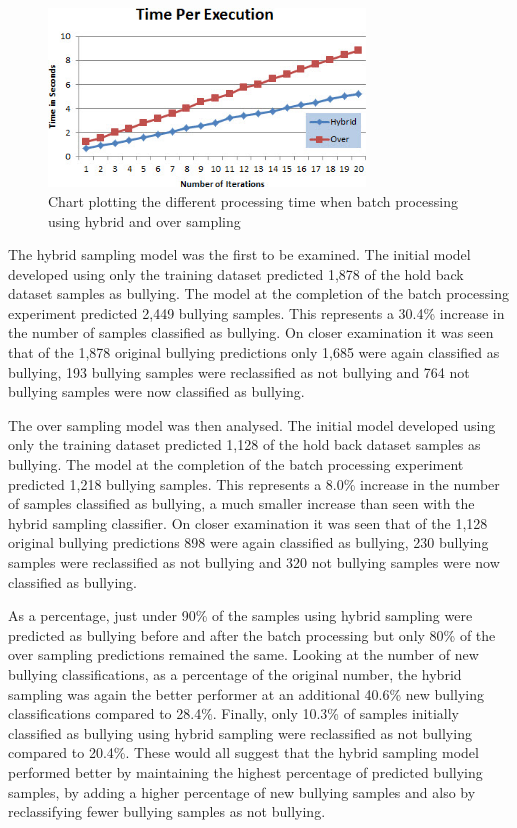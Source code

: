 \begin{figure}[htbp]
	\centering
	\includegraphics[width=0.75\textwidth]{Figures/Chapter5/execution_time.jpg}
	\caption[Processing time for batch simulation]{Chart plotting the different processing time when batch processing using hybrid and over sampling}
	\label{fig:execution_time}
\end{figure}

The hybrid sampling model was the first to be examined. The initial model developed using only the training dataset predicted 1,878 of the hold back dataset samples as bullying. The model at the completion of the batch processing experiment predicted 2,449 bullying samples. This represents a 30.4\% increase in the number of samples classified as bullying. On closer examination it was seen that of the 1,878 original bullying predictions only 1,685 were again classified as bullying, 193 bullying samples were reclassified as not bullying and 764 not bullying samples were now classified as bullying. 

The over sampling model was then analysed. The initial model developed using only the training dataset predicted 1,128 of the hold back dataset samples as bullying. The model at the completion of the batch processing experiment predicted 1,218 bullying samples. This represents a 8.0\% increase in the number of samples classified as bullying, a much smaller increase than seen with the hybrid sampling classifier. On closer examination it was seen that of the 1,128 original bullying predictions 898 were again classified as bullying, 230 bullying samples were reclassified as not bullying and 320 not bullying samples were now classified as bullying.

As a percentage, just under 90\% of the samples using hybrid sampling were predicted as bullying before and after the batch processing but only 80\% of the over sampling predictions remained the same. Looking at the number of new bullying classifications, as a percentage of the original number, the hybrid sampling was again the better performer at an additional 40.6\% new bullying classifications compared to 28.4\%. Finally, only 10.3\% of samples initially classified as bullying using hybrid sampling were reclassified as not bullying compared to 20.4\%. These would all suggest that the hybrid sampling model performed better by maintaining the highest percentage of predicted bullying samples, by adding a higher percentage of new bullying samples and also by reclassifying fewer bullying samples as not bullying.

